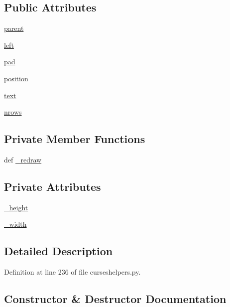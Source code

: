 \subsection*{Public Attributes}
\begin{DoxyCompactItemize}
\item 
\hyperlink{classcurseshelpers_1_1Text_a35b8e8038798bc92d3d529cc9f9a98e6}{parent}
\item 
\hyperlink{classcurseshelpers_1_1Text_a54907ebaeb319b047d9b91ff92db743d}{left}
\item 
\hyperlink{classcurseshelpers_1_1Text_a35d7c4f3277e3b6ac5c778ffffb6a9be}{pad}
\item 
\hyperlink{classcurseshelpers_1_1Text_aef71ab86df8cc8b825e5cd4dd74b755c}{position}
\item 
\hyperlink{classcurseshelpers_1_1Text_a222182a72920f287764749d8d65255ea}{text}
\item 
\hyperlink{classcurseshelpers_1_1Text_aff1dcc1b7a0ddec14bbff154e00361de}{nrows}
\end{DoxyCompactItemize}
\subsection*{Private Member Functions}
\begin{DoxyCompactItemize}
\item 
def \hyperlink{classcurseshelpers_1_1Text_a067792f39dbe39d24e907b65e9d1f28f}{\-\_\-redraw}
\end{DoxyCompactItemize}
\subsection*{Private Attributes}
\begin{DoxyCompactItemize}
\item 
\hyperlink{classcurseshelpers_1_1Text_a6efc6c11f25be153a47e366aaef42345}{\-\_\-height}
\item 
\hyperlink{classcurseshelpers_1_1Text_af1233fa6fe021ca2755165214cf0746e}{\-\_\-width}
\end{DoxyCompactItemize}


\subsection{Detailed Description}


Definition at line 236 of file curseshelpers.\-py.



\subsection{Constructor \& Destructor Documentation}
